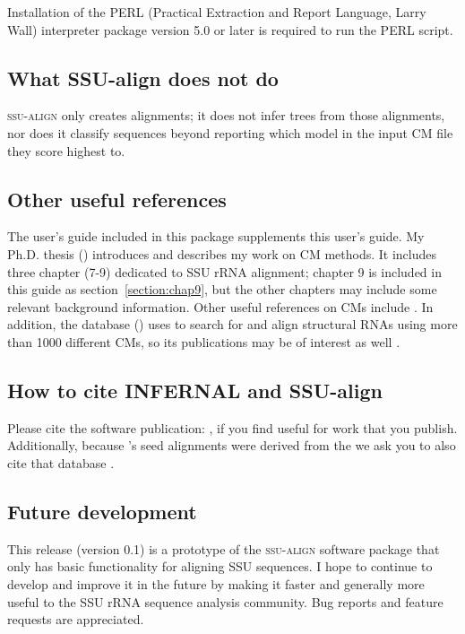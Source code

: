 Installation of the PERL (Practical Extraction and Report Language,
Larry Wall) interpreter package version 5.0 or later is required to
run the  PERL script.

\subsection{What SSU-align does not do}

\textsc{ssu-align} only creates alignments; it does not infer trees
from those alignments, nor does it classify sequences beyond reporting
which model in the input CM file they score highest to.

\subsection{Other useful references}

The  user's guide \cite{infernalguide} included in
this package supplements this user's guide. My Ph.D. thesis 
()
introduces and describes my work on CM methods. It includes three chapter (7-9) dedicated to
SSU rRNA alignment; chapter 9 is included in this guide as
section~\ref{section:chap9}, but the other chapters may include some
relevant background information. 
Other useful references on CMs include
\cite{Eddy94,Eddy02b,NawrockiEddy07,Nawrocki09,KolbeEddy09}. In
addition, the  database 
()
uses  to search for and align
structural RNAs using more than 1000 different CMs, so its
publications may be of interest as well
\cite{Griffiths-Jones03,Griffiths-Jones05,Gardner09}.

\subsection{How to cite INFERNAL and SSU-align}

Please cite the  software publication:
\cite{Nawrocki09}, if you find  useful for work that
you publish. Additionally, because 's seed alignments were
derived from the  we ask you to also cite
that database \cite{CannoneGutell02}. 

\subsection{Future development}

This release (version 0.1) is a prototype of the \textsc{ssu-align}
software package that only has basic functionality for aligning SSU
sequences. I hope to continue to develop and improve it in the future
by making it faster and generally more useful to the SSU rRNA sequence
analysis community. Bug reports and feature requests are appreciated.
